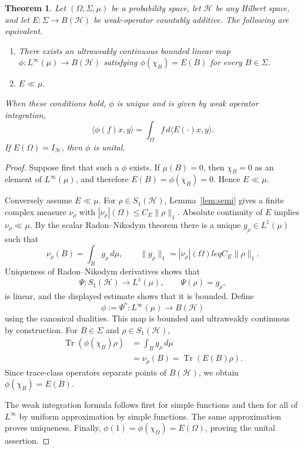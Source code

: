 \documentclass[11pt]{article}
\newtheorem{theorem}{Theorem}
\newcommand{\BH}{B(\mathcal H)}
\newcommand{\Sone}{S_1(\mathcal H)}
\begin{document}
\begin{theorem}\label{thm:main}
Let $(\Omega,\Sigma,\mu)$ be a probability space, let $\mathcal H$ be any
Hilbert space, and let $E:\Sigma\to\BH$ be weak-operator countably additive.
The following are equivalent.
\begin{enumerate}
\item There exists an ultraweakly continuous bounded linear map
$\phi:L^\infty(\mu)\to\BH$ satisfying
$\phi(\chi_B)=E(B)$ for every $B\in\Sigma$.
\item $E\ll\mu$.
\end{enumerate}
When these conditions hold, $\phi$ is unique and is given by weak operator
integration,
\[
 \langle\phi(f)x,y\rangle=\int_\Omega f\,d\langle E(\cdot)x,y\rangle.
\]
If $E(\Omega)=I_{\mathcal H}$, then $\phi$ is unital.
\end{theorem}

\begin{proof}
Suppose first that such a $\phi$ exists.  If $\mu(B)=0$, then
$\chi_B=0$ as an element of $L^\infty(\mu)$, and therefore
$E(B)=\phi(\chi_B)=0$.  Hence $E\ll\mu$.

Conversely assume $E\ll\mu$.  For $\rho\in\Sone$, Lemma~\ref{lem:semi}
gives a finite complex measure $\nu_\rho$ with
$|\nu_\rho|(\Omega)\leq C_E\|\rho\|_1$.  Absolute continuity of $E$ implies
$\nu_\rho\ll\mu$.  By the scalar Radon--Nikodym theorem there is a unique
$g_\rho\in L^1(\mu)$ such that
\[
 \nu_\rho(B)=\int_B g_\rho\,d\mu,
 \qquad \|g_\rho\|_1=|\nu_\rho|(\Omega)leq C_E\|\rho\|_1.
\]
Uniqueness of Radon--Nikodym derivatives shows that
\[
 \Psi:\Sone\longrightarrow L^1(\mu),\qquad \Psi(\rho)=g_\rho,
\]
is linear, and the displayed estimate shows that it is bounded.  Define
\[
 \phi:=\Psi^*:L^\infty(\mu)\longrightarrow\BH
\]
using the canonical dualities.  This map is bounded and ultraweakly
continuous by construction.  For $B\in\Sigma$ and $\rho\in\Sone$,
\begin{align*}
 \operatorname{Tr}(\phi(\chi_B)\rho)
 &=\int_B g_\rho\,d\mu\\
 &=\nu_\rho(B)
 =\operatorname{Tr}(E(B)\rho).
\end{align*}
Since trace-class operators separate points of $\BH$, we obtain
$\phi(\chi_B)=E(B)$.

The weak integration formula follows first for simple functions and then for
all of $L^\infty$ by uniform approximation by simple functions.  The same
approximation proves uniqueness.  Finally,
$\phi(1)=\phi(\chi_\Omega)=E(\Omega)$, proving the unital assertion.
\end{proof}
\end{document}
